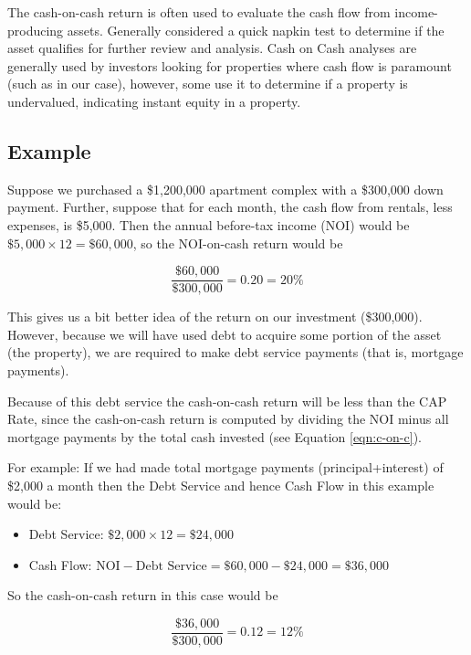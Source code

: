 \documentclass[11pt, oneside]{article}   	%
\theoremstyle{definition}
\begin{document}
\bigskip
\noindent
The cash-on-cash return  is often used to evaluate the cash flow from income-producing assets. Generally considered a quick napkin test to determine if the asset qualifies for further review and analysis. Cash on Cash analyses are generally used by investors looking for properties where cash flow is paramount (such as in our case), however, some use it to determine if a property is undervalued, indicating instant equity in a property.

\subsection{Example}
Suppose we purchased a \$1,200,000 apartment complex with a \$300,000 down payment. Further, suppose that for each month, the cash flow from rentals, less expenses, is 
\$5,000. Then the annual before-tax income (NOI) would be $\$5,000 \times 12 = \$60,000$, so the NOI-on-cash return would be

\begin{equation*}
\frac {\$60,000}{\$300,000} = 0.20 = 20\%
\end{equation*}

\bigskip
\noindent
This gives us a bit better idea of the return on our investment (\$300,000). However, because we will have used debt to acquire some portion of the asset (the
property), we are required to make debt service payments (that is, mortgage payments).

\bigskip
\noindent
Because of this debt service the cash-on-cash 
return will be less than the CAP Rate, since the cash-on-cash return is computed by dividing the NOI minus all  mortgage payments by the total 
cash invested (see Equation \ref{eqn:c-on-c}).

\bigskip
\noindent
For example: If we had made total mortgage payments (principal+interest) of \$2,000 a month then the Debt Service and hence Cash Flow in this example would be: 

\begin{itemize}
\item Debt Service:  $\$2,000 \times 12 =  \$24,000$
\item Cash Flow:      $\text{NOI} - \text{Debt Service} = \$60,000 - \$24,000 = \$36,000$
\end{itemize}

\bigskip
\noindent
So the cash-on-cash return in this case would be

\begin{equation*}
\frac {\$36,000}{\$300,000} = 0.12 = 12\%
\end{equation*}
\end{document}
